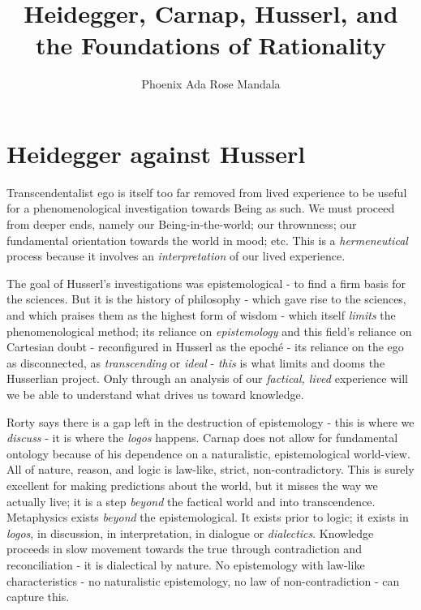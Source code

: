\documentclass[leqno]{article}
\title{Heidegger, Carnap, Husserl, and the Foundations of Rationality}
\author{Phoenix Ada Rose Mandala}
\begin{document}
	\maketitle

	\section{Heidegger against Husserl}

	Transcendentalist ego is itself too far removed from lived experience to be useful
	for a phenomenological investigation towards Being as such. We must proceed
	from deeper ends, namely our Being-in-the-world; our thrownness; our fundamental
	orientation towards the world in mood; etc. This is a \emph{hermeneutical}
	process because it involves an \emph{interpretation} of our lived experience.

	The goal of Husserl's investigations was epistemological - to find a firm basis
	for the sciences. But it is the history of philosophy - which gave rise to the
	sciences, and which praises them as the highest form of wisdom - which itself \emph{limits}
	the phenomenological method; its reliance on \emph{epistemology} and this
	field's reliance on Cartesian doubt - reconfigured in Husserl as the epoch\'e
	- its reliance on the ego as disconnected, as \emph{transcending} or \emph{ideal}
	- \emph{this} is what limits and dooms the Husserlian project. Only through an
	analysis of our \emph{factical, lived} experience will we be able to
	understand what drives us toward knowledge.

	Rorty says there is a gap left in the destruction of epistemology - this is
	where we \emph{discuss} - it is where the \textit{logos} happens. Carnap does not
	allow for fundamental ontology because of his dependence on a naturalistic,
	epistemological world-view. All of nature, reason, and logic is law-like,
	strict, non-contradictory. This is surely excellent for making predictions
	about the world, but it misses the way we actually live; it is a step \emph{beyond}
	the factical world and into transcendence. Metaphysics exists \emph{beyond} the
	epistemological. It exists prior to logic; it exists in \textit{logos}, in discussion,
	in interpretation, in dialogue or \emph{dialectics}. Knowledge proceeds in slow
	movement towards the true through contradiction and reconciliation - it is dialectical
	by nature. No epistemology with law-like characteristics - no naturalistic
	epistemology, no law of non-contradiction - can capture this.
\end{document}
